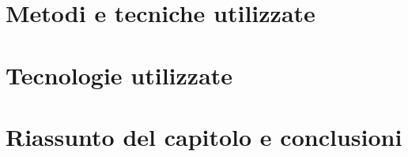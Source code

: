 \section{Metodi e tecniche utilizzate}

%
%


\section{Tecnologie utilizzate}

%
%







\section{Riassunto del capitolo e conclusioni}


